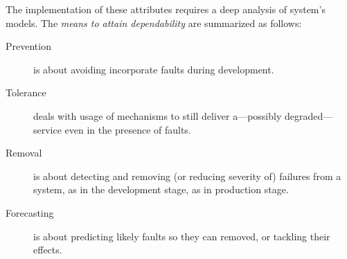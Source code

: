 \documentclass[12pt,openright,twoside,a4paper,oldfontcommands,english,brazil,draft]{abntex2}
\theoremstyle{theo}
\begin{document}
The implementation of these attributes requires a deep analysis of system's models.
The \emph{means to attain dependability} are summarized as follows:

\begin{description}
  \item[Prevention] is about avoiding incorporate faults during development.
  \item[Tolerance] deals with usage of mechanisms to still deliver a---possibly degraded---service even in the presence of faults.
  \item[Removal] is about detecting and removing (or reducing severity of) failures from a system, as in the development stage, as in production stage.
  \item[Forecasting] is about predicting likely faults so they can removed, or tackling their effects.
\end{description}
\end{document}
